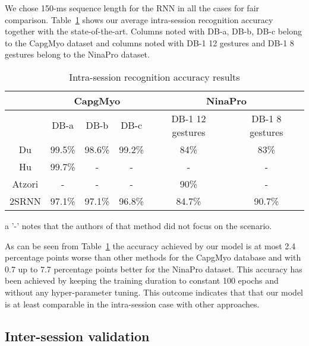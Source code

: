 \documentclass[conference]{IEEEtran}
\begin{document}
We chose 150-ms sequence length for the RNN in all the cases for fair comparison. Table~\ref{table:intra-session} shows our average intra-session recognition accuracy together with the state-of-the-art.
Columns noted with DB-a, DB-b, DB-c belong to the CapgMyo dataset and columns noted with DB-1 12 gestures and DB-1 8 gestures belong to the NinaPro dataset.
\begin{table}[tbp]
	\centering
	\begin{threeparttable}
		\setlength{\tabcolsep}{3pt}
		\def\arraystretch{1.5}\begin{tabular}{|c|c|c|c|c|c|} 
			\hline
			& \multicolumn{3}{|c|}{CapgMyo} & \multicolumn{2}{|c|}{NinaPro} \\
			\hline
			& DB-a & DB-b & DB-c & DB-1 12 gestures & DB-1 8 gestures \\
			Du\cite{b18} & 99.5\% & 98.6\% & 99.2\% & 84\% & 83\% \\
			Hu\cite{b19} & 99.7\% & -\tnote{a} & - & - & - \\
			Atzori\cite{b23} & - & - & - & 90\% & - \\
			2SRNN & 97.1\% & 97.1\% & 96.8\% & 84.7\% & 90.7\% \\
			\hline
		\end{tabular}
		\caption{Intra-session recognition accuracy results}
		\begin{tablenotes}
			\item[a] '-' notes that the authors of that method did not focus on the scenario.
		\end{tablenotes}
		\label{table:intra-session}
	\end{threeparttable}
\end{table}
As can be seen from Table~\ref{table:intra-session} the accuracy achieved by our model is at most 2.4 percentage points worse than other methods for the CapgMyo database and with 0.7 up to 7.7 percentage points better for the NinaPro dataset. This accuracy has been achieved by keeping the training duration to constant 100 epochs and without any hyper-parameter tuning. This outcome indicates that that our model is at least comparable in the intra-session case with other approaches.

\subsection{Inter-session validation}
\end{document}
